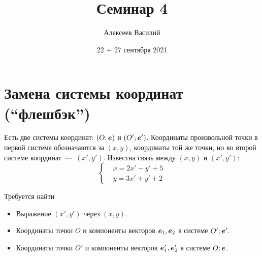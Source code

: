 \documentclass[a4paper,12pt]{article}
\author{Алексеев Василий}
\title{Семинар 4}
\date{22 + 27 сентября 2021}
\begin{document}
  \maketitle
  
  \tableofcontents

  \thispagestyle{empty}
  
  \newpage
  
  
  
  \section{Замена системы координат (``флешбэк'')}
  
  \begin{problem}[4.5]
    Есть две системы координат: $(O; \boldsymbol e)$ и $(O'; \boldsymbol e')$.
    Координаты произвольной точки в первой системе обозначаются за $(x, y)$, координаты той же точки, но во второй системе координат~---~$(x', y')$.
    Известна связь между $(x, y)$ и $(x', y')$:
    \[
      \left\{
        \begin{aligned}
          &x = 2x' - y' + 5\\
          &y = 3x' + y' + 2
        \end{aligned}
      \right.
    \]
    
    Требуется найти
    \begin{itemize}
      \item Выражение $(x', y')$ через $(x, y)$.
      \item Координаты точки $O$ и компоненты векторов $\boldsymbol e_1, \boldsymbol e_2$ в системе $O'; \boldsymbol e'$.
      \item Координаты точки $O'$ и компоненты векторов $\boldsymbol e_1', \boldsymbol e_2'$ в системе $O; \boldsymbol e$.
    \end{itemize}
  \end{problem}
  
\end{document}

